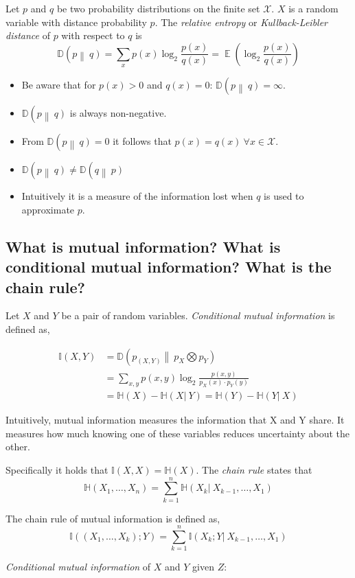 \documentclass[a4paper]{article}
\newcommand\op[2][P]{\mathbb{#1}\left(#2\right)}
\newcommand\cond[3][P]{\mathbb{#1}\left(#2 \left|\:#3\right)\right.}
\newcommand\kld[3][D]{\mathbb{#1}\left(#2 \left\|\:#3\right)\right.}
\newcommand\key[1]{\textit{#1}}
\DeclareMathOperator{\Ex}{\mathbb{E}}
\theoremstyle{definition}
\begin{document}
Let $p$ and $q$ be two probability distributions on the finite set $\mathcal{X}$.
$X$ is a random variable with distance probability $p$.
The \key{relative entropy} or \key{Kullback-Leibler distance} of $p$ with respect to $q$ is
\[ \kld{p}{q}  = \sum_x p(x) \log_2 \frac{p(x)}{q(x)} = \Ex\left(\log_2 \frac{p(x)}{q(x)}\right) \]

\begin{itemize}
  \item Be aware that for $p(x) > 0$ and $q(x) = 0$: $\kld pq  = \infty$.
  \item $\kld pq $ is always non-negative.
  \item From $\kld pq = 0$ it follows that $p(x) = q(x) \: \forall x \in \mathcal{X}$.
  \item $\kld pq \neq \kld qp$
  \item Intuitively it is a measure of the information lost when $q$ is used to approximate $p$.
\end{itemize}

\subsection{What is mutual information? What is conditional mutual information? What is the chain rule?}

Let $X$ and $Y$ be a pair of random variables. \key{Conditional mutual information} is defined as,

\begin{align*}
  \op[I]{X, Y} &= \kld{p_{(X,Y)}}{p_X \bigotimes p_Y} \\
               &= \sum_{x,y} p(x,y) \log_2 \frac{p(x,y)}{p_X(x)\cdot p_Y(y)} \\
               &= \op[H]{X} - \cond[H] XY = \op[H]{Y} - \cond[H] YX
\end{align*}

Intuitively, mutual information measures the information that X and Y share. It measures how much knowing one of these variables reduces uncertainty about the other.

Specifically it holds that $\op[I]{X, X} = \op[H]{X}$. The \key{chain rule} states that
\[
  \op[H]{X_1, \dotsc, X_n} = \sum_{k=1}^n \cond[H]{X_k}{X_{k-1}, \dotsc, X_{1}}
\]

The chain rule of mutual information is defined as,
\[
  \op[I]{(X_1, \dotsc, X_k); Y} = \sum_{k=1}^n \cond[I]{X_k; Y}{X_{k-1},\dotsc,X_{1}}
\]

\key{Conditional mutual information} of $X$ and $Y$ given $Z$:
\end{document}
